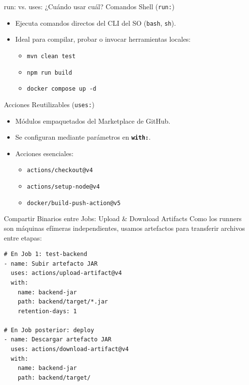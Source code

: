 \documentclass[aspectratio=169]{beamer}
\begin{document}

\contentSlideTwoCols
  {run: vs. uses: ¿Cuándo usar cuál?}
  {Comandos Shell (\texttt{run:})}
  {
    \begin{itemize}
      \item Ejecuta comandos directos del CLI del SO (\texttt{bash}, \texttt{sh}).
      \item Ideal para compilar, probar o invocar herramientas locales:
      \begin{itemize}
        \item \texttt{mvn clean test}
        \item \texttt{npm run build}
        \item \texttt{docker compose up -d}
      \end{itemize}
    \end{itemize}
  }
  {Acciones Reutilizables (\texttt{uses:})}
  {
    \begin{itemize}
      \item Módulos empaquetados del Marketplace de GitHub.
      \item Se configuran mediante parámetros en \textbf{\texttt{with:}}.
      \item Acciones esenciales:
      \begin{itemize}
        \item \texttt{actions/checkout@v4}
        \item \texttt{actions/setup-node@v4}
        \item \texttt{docker/build-push-action@v5}
      \end{itemize}
    \end{itemize}
  }

\begin{frame}[fragile]{Compartir Binarios entre Jobs: Upload \& Download Artifacts}
  \vspace{0.1cm}
  Como los runners son máquinas efímeras independientes, usamos artefactos para transferir archivos entre etapas:
  \vspace{0.15cm}
  \begin{lstlisting}[style=yamllst]
# En Job 1: test-backend
- name: Subir artefacto JAR
  uses: actions/upload-artifact@v4
  with:
    name: backend-jar
    path: backend/target/*.jar
    retention-days: 1

# En Job posterior: deploy
- name: Descargar artefacto JAR
  uses: actions/download-artifact@v4
  with:
    name: backend-jar
    path: backend/target/
  \end{lstlisting}
\end{frame}
\end{document}
